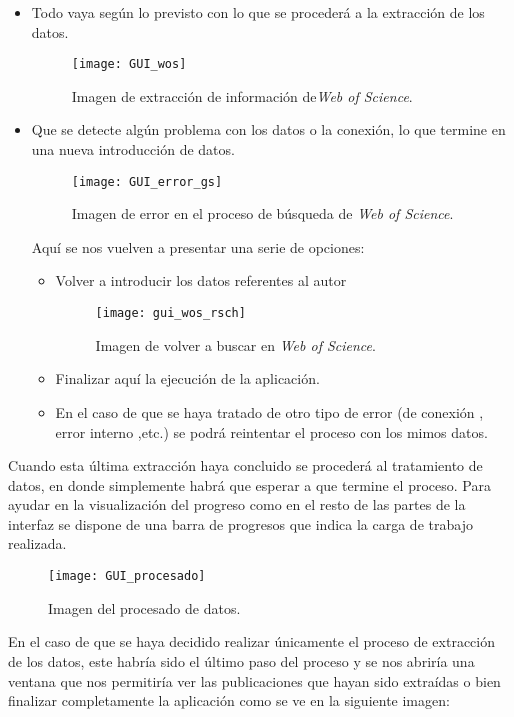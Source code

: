 \begin{itemize}
	\item Todo vaya según lo previsto con lo que se procederá a la extracción de los datos.
				
		\begin{figure}[H]
		\centering
		\texttt{[image: GUI\_wos]}
		\caption{Imagen de extracción de información de\emph{Web of Science}.}
		\end{figure}
	
	\item Que se detecte algún problema con los datos o la conexión, lo que termine en una nueva introducción de datos.
		
	\begin{figure}[H]
	\centering
	\texttt{[image: GUI\_error\_gs]}
	\caption{Imagen de error en el proceso de búsqueda de \emph{Web of Science}.}
	\end{figure}
	Aquí se nos vuelven a presentar una serie de opciones:
	\begin{itemize}
		\item Volver a introducir los datos referentes al autor 
			
		\begin{figure}[H]
		\centering
		\texttt{[image: gui\_wos\_rsch]}
		\caption{Imagen de volver a buscar en \emph{Web of Science}.}
		\end{figure}
	
		\item Finalizar aquí la ejecución de la aplicación.
		\item En el caso de que se haya tratado de otro tipo de error (de conexión , error interno ,etc.) se podrá reintentar el proceso con los mimos datos.
	\end{itemize}
\end{itemize}

Cuando esta última extracción haya concluido se procederá al tratamiento de datos,	en donde simplemente habrá que esperar a que termine el proceso. Para ayudar en la visualización del progreso como en el resto de las partes de la interfaz se dispone de una barra de progresos que indica la carga de trabajo realizada.

		\begin{figure}[H]
		\centering
		\texttt{[image: GUI\_procesado]}
		\caption{Imagen del procesado de datos.}
		\end{figure}
		
En el caso de que se haya decidido realizar únicamente el proceso de extracción de los datos, este habría sido el último paso del proceso y se nos abriría una ventana que nos permitiría ver las publicaciones que hayan sido extraídas o bien finalizar completamente la aplicación como se ve en la siguiente imagen:

